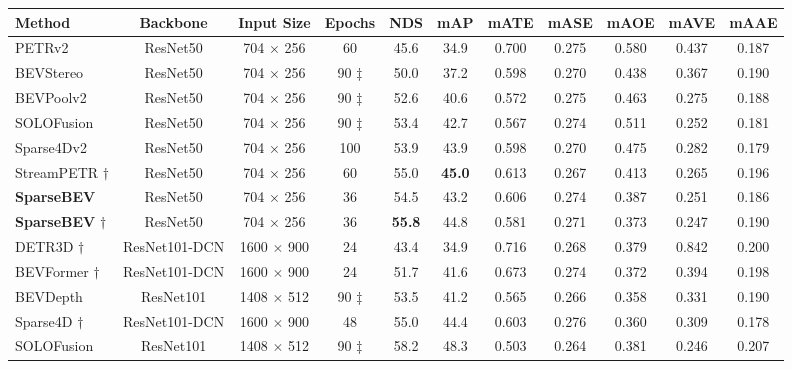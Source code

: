 \documentclass[10pt,twocolumn,letterpaper]{article}
\begin{document}
\setlength{\tabcolsep}{4pt}
\begin{table*}[t]
   \centering
   \begin{tabular}{l|ccc|cc|ccccc}
      \toprule
      Method & Backbone & Input Size & Epochs & NDS & mAP & mATE & mASE & mAOE & mAVE & mAAE \\
      \midrule
PETRv2 \cite{petrv2}         & ResNet50 & 704 $\times$ 256 & 60            & 45.6 & 34.9 & 0.700 & 0.275 & 0.580 & 0.437 & 0.187 \\
      BEVStereo \cite{bevstereo}   & ResNet50 & 704 $\times$ 256 & 90 $\ddagger$ & 50.0 & 37.2 & 0.598 & 0.270 & 0.438 & 0.367 & 0.190 \\
      BEVPoolv2 \cite{bevpoolv2}   & ResNet50 & 704 $\times$ 256 & 90 $\ddagger$ & 52.6 & 40.6 & 0.572 & 0.275 & 0.463 & 0.275 & 0.188 \\
      SOLOFusion \cite{solofusion} & ResNet50 & 704 $\times$ 256 & 90 $\ddagger$ & 53.4 & 42.7 & 0.567 & 0.274 & 0.511 & 0.252 & 0.181 \\
      Sparse4Dv2 \cite{sparse4dv2} & ResNet50 & 704 $\times$ 256 & 100 & 53.9 & 43.9 & 0.598 & 0.270 & 0.475 & 0.282 & 0.179 \\
      StreamPETR $\dagger$ \cite{streampetr} & ResNet50 & 704 $\times$ 256 & 60 & 55.0 & \textbf{45.0} & 0.613 & 0.267 & 0.413 & 0.265 & 0.196  \\
      \rowcolor{Gray}
      \textbf{SparseBEV}           & ResNet50 & 704 $\times$ 256 & 36 & 54.5 & 43.2 & 0.606 & 0.274 & 0.387 & 0.251 & 0.186 \\
      \rowcolor{Gray}
      \textbf{SparseBEV} $\dagger$ & ResNet50 & 704 $\times$ 256 & 36 & \textbf{55.8} & 44.8 & 0.581 & 0.271 & 0.373 & 0.247 & 0.190 \\
      \midrule
      DETR3D $\dagger$ \cite{detr3d}       & ResNet101-DCN & 1600 $\times$ 900 & 24 & 43.4 & 34.9 & 0.716 & 0.268 & 0.379 & 0.842 & 0.200 \\
      BEVFormer $\dagger$ \cite{bevformer} & ResNet101-DCN & 1600 $\times$ 900 & 24 & 51.7 & 41.6 & 0.673 & 0.274 & 0.372 & 0.394 & 0.198 \\
      BEVDepth \cite{bevdepth}             & ResNet101 & 1408 $\times$ 512 & 90 $\ddagger$ & 53.5 & 41.2 & 0.565 & 0.266 & 0.358 & 0.331 & 0.190 \\
      Sparse4D $\dagger$ \cite{sparse4d}   & ResNet101-DCN & 1600 $\times$ 900 & 48 & 55.0 & 44.4 & 0.603 & 0.276 & 0.360 & 0.309 & 0.178 \\
      SOLOFusion \cite{solofusion}         & ResNet101 & 1408 $\times$ 512 & 90 $\ddagger$ & 58.2 & 48.3 & 0.503 & 0.264 & 0.381 & 0.246 & 0.207 \\

\end{tabular}
\end{table*}
\end{document}

